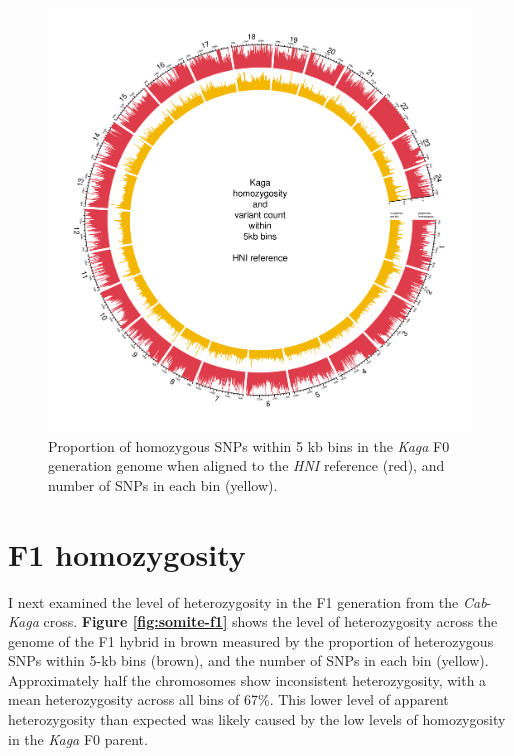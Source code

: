 \documentclass[
]{book}
\begin{document}
\begin{figure}
\includegraphics[width=1\linewidth]{figs/somites/Kaga_HNI} \caption{Proportion of homozygous SNPs within 5 kb bins in the \emph{Kaga} F0 generation genome when aligned to the \emph{HNI} reference (red), and number of SNPs in each bin (yellow).}\label{fig:somite-f0-kaga-hni}
\end{figure}

\hypertarget{f1-homozygosity}{%
\section{F1 homozygosity}\label{f1-homozygosity}}

I next examined the level of heterozygosity in the F1 generation from the \emph{Cab}-\emph{Kaga} cross. \textbf{Figure \ref{fig:somite-f1}} shows the level of heterozygosity across the genome of the F1 hybrid in brown measured by the proportion of heterozygous SNPs within 5-kb bins (brown), and the number of SNPs in each bin (yellow). Approximately half the chromosomes show inconsistent heterozygosity, with a mean heterozygosity across all bins of 67\%. This lower level of apparent heterozygosity than expected was likely caused by the low levels of homozygosity in the \emph{Kaga} F0 parent.
\end{document}
